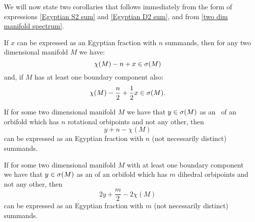 %

We will now state two corollaries that follows immediately from the 
form of expressions \ref{Egyptian S2 sum} and \ref{Egyptian D2 sum}, and from 
\ref{two dim manifold spectrum}.
\begin{corollary}\label{from Egyptian fractions}
If $x$ can be expressed as an Egyptian fraction with $n$ summands, then for any two dimensional 
manifold $M$ we have: 
\begin{equation}
\chi(M) - n + x \in {{\sigma}(M)}
\end{equation}
and, if $M$ has at least one boundary component also:
\begin{equation}
\chi(M) - \frac{n}{2} + \frac{1}{2}x \in {{\sigma}(M)}.
\end{equation}
\end{corollary}
\begin{corollary}\label{to egyptian fractions}
If for some two dimensional manifold $M$ we have that $y \in {{\sigma}(M)}$ as an \Eoc\ of 
an orbifold which has $n$ rotational orbipoints and not any other, 
then 
\begin{equation}
y + n - \chi(M)
\end{equation} 
can be expressed as an Egyptian fraction with $n$ 
(not necessarily distinct) summands. 

If for some two dimensional manifold $M$ with at least one boundary component 
we have that $y \in {{\sigma}(M)}$ as an \Eoc of an orbifold which has $m$ dihedral orbipoints and 
not any other, 
then 
\begin{equation}
2y + \frac{m}{2} - 2\chi(M)
\end{equation}
can be expressed as an Egyptian fraction with $m$ 
(not necessarily distinct) summands. 
\end{corollary}


